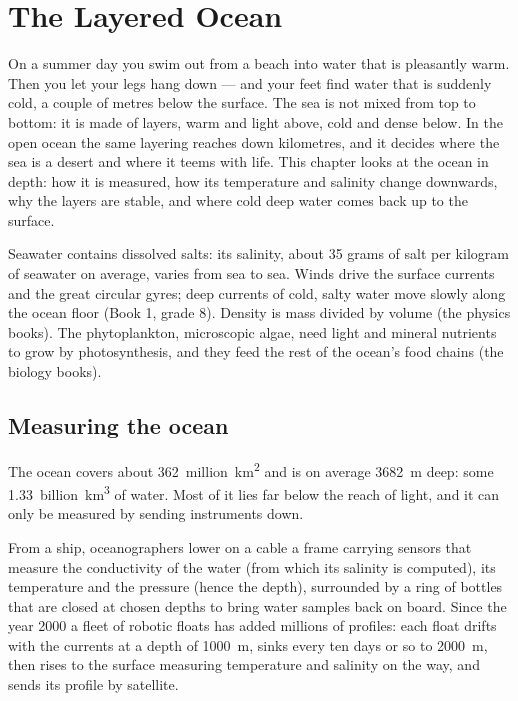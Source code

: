 \chapter{The Layered Ocean}\label{ch:g10:layered-ocean}

On a summer day you swim out from a beach into water that is pleasantly warm.
Then you let your legs hang down --- and your feet find water that is
suddenly cold, a couple of metres below the surface. The sea is not mixed
from top to bottom: it is made of layers, warm and light above, cold and
dense below. In the open ocean the same layering reaches down kilometres,
and it decides where the sea is a desert and where it teems with life. This
chapter looks at the ocean in depth: how it is measured, how its temperature
and salinity change downwards, why the layers are stable, and where cold deep
water comes back up to the surface.

\begin{recall}
Seawater contains dissolved salts: its salinity, about 35 grams of salt per
kilogram of seawater on average, varies from sea to sea. Winds drive the
surface currents and the great circular gyres; deep currents of cold, salty
water move slowly along the ocean floor (Book 1, grade 8). Density is mass
divided by volume (the physics books). The phytoplankton, microscopic algae,
need light and mineral nutrients to grow by photosynthesis, and they feed the
rest of the ocean's food chains (the biology books).
\end{recall}

\section{Measuring the ocean}

The ocean covers about \num{362}~million~\unit{km^2} and is on average
\qty{3682}{m} deep: some \num{1.33}~billion~\unit{km^3} of water. Most of it lies
far below the reach of light, and it can only be measured by sending
instruments down.

From a ship, oceanographers lower on a cable a frame carrying sensors that
measure the conductivity of the water (from which its salinity is computed),
its temperature and the pressure (hence the depth), surrounded by a ring of
bottles that are closed at chosen depths to bring water samples back on
board. Since the year 2000 a fleet of robotic floats has added millions of
profiles: each float drifts with the currents at a depth of \qty{1000}{m},
sinks every ten days or so to \qty{2000}{m}, then rises to the surface
measuring temperature and salinity on the way, and sends its profile by
satellite.

